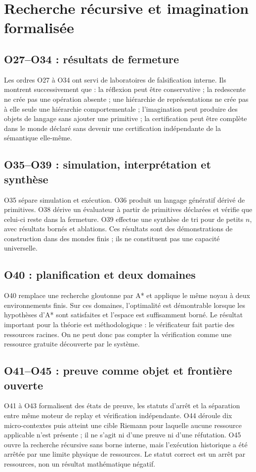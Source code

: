 \documentclass[11pt,a4paper,openany]{book}
\begin{document}
\chapter{Recherche récursive et imagination formalisée}
\section{O27--O34 : résultats de fermeture}
Les ordres O27 à O34 ont servi de laboratoires de falsification interne. Ils montrent successivement que : la réflexion peut être conservative ; la redescente ne crée pas une opération absente ; une hiérarchie de représentations ne crée pas à elle seule une hiérarchie comportementale ; l'imagination peut produire des objets de langage sans ajouter une primitive ; la certification peut être complète dans le monde déclaré sans devenir une certification indépendante de la sémantique elle-même.

\section{O35--O39 : simulation, interprétation et synthèse}
O35 sépare simulation et exécution. O36 produit un langage génératif dérivé de primitives. O38 dérive un évaluateur à partir de primitives déclarées et vérifie que celui-ci reste dans la fermeture. O39 effectue une synthèse de tri pour de petits \(n\), avec résultats bornés et ablations. Ces résultats sont des démonstrations de construction dans des mondes finis ; ils ne constituent pas une capacité universelle.

\section{O40 : planification et deux domaines}
O40 remplace une recherche gloutonne par A* et applique le même noyau à deux environnements finis. Sur ces domaines, l'optimalité est démontrable lorsque les hypothèses d'A* sont satisfaites et l'espace est suffisamment borné. Le résultat important pour la théorie est méthodologique : le vérificateur fait partie des ressources racines. On ne peut donc pas compter la vérification comme une ressource gratuite découverte par le système.

\section{O41--O45 : preuve comme objet et frontière ouverte}
O41 à O43 formalisent des états de preuve, les statuts d'arrêt et la séparation entre même moteur de replay et vérification indépendante. O44 déroule dix micro-contextes puis atteint une cible Riemann pour laquelle aucune ressource applicable n'est présente ; il ne s'agit ni d'une preuve ni d'une réfutation. O45 ouvre la recherche récursive sans borne interne, mais l'exécution historique a été arrêtée par une limite physique de ressources. Le statut correct est un arrêt par ressources, non un résultat mathématique négatif.
\end{document}
